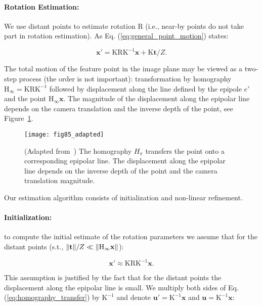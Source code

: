 \paragraph{Rotation Estimation:}\label{sec:rotation_estimation}
We use distant points to estimate rotation $\mathrm{R}$ (i.e., near-by
points do not take part in rotation estimation). As Eq.
(\ref{eq:general_point_motion}) states:

\begin{equation}
  \mathbf{x}' = \mathrm{KRK^{-1}}\mathbf{x} + \mathrm{K}\mathbf{t}/Z.
\end{equation}

The total motion of the feature point in the image plane may be viewed
as a two-step process (the order is not important): transformation by
homography $\mathrm{H_\infty} = \mathrm{KRK^{-1}}$ followed by
displacement along the line defined by the epipole $e'$ and the point
$\mathrm{H_\infty}\mathbf{x}$.  The magnitude of the displacement
along the epipolar line depends on the camera translation and the
inverse depth of the point, see Figure~\ref{fig:feature_motion}.

\begin{figure}[h]
  \centering
  \texttt{[image: fig85\_adapted]}
  \caption{(Adapted from~\cite{Hartley2004}) The homography $H_\pi$ transfers the point onto a corresponding epipolar line.  The displacement along the epipolar line depends on the inverse depth of the point and the camera translation magnitude.}
  \label{fig:feature_motion}
\end{figure}                                                             %

Our estimation algorithm consists of initialization and non-linear
refinement.
\paragraph{Initialization:} to compute the initial estimate of the rotation
parameters we assume that for the distant points (s.t., $\lVert\mathbf{t}\rVert/Z \ll \lVert\mathrm{H_\infty}\mathbf{x}\rVert$):

\begin{equation}\label{eq:homography_transfer}
  \mathbf{x}' \approx \mathrm{KRK^{-1}}\mathbf{x}.
\end{equation}

This assumption is justified by the fact that for the distant points
the displacement along the epipolar line is small. We multiply
both sides of Eq. (\ref{eq:homography_transfer}) by $\mathrm{K^{-1}}$
and denote $\mathbf{u'} = \mathrm{K^{-1}}\mathbf{x}$ and
$\mathbf{u} = \mathrm{K^{-1}}\mathbf{x}$:

